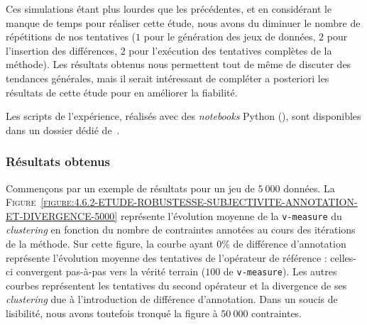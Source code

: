 			\begin{leftBarWarning}
				Ces simulations étant plus lourdes que les précédentes, et en considérant le manque de temps pour réaliser cette étude, nous avons du diminuer le nombre de répétitions de nos tentatives ($1$ pour le génération des jeux de données, $2$ pour l'insertion des différences, $2$ pour l'exécution des tentatives complètes de la méthode).
				Les résultats obtenus nous permettent tout de même de discuter des tendances générales, mais il serait intéressant de compléter a posteriori les résultats de cette étude pour en améliorer la fiabilité.
			\end{leftBarWarning}
			
			\begin{leftBarInformation}
				Les scripts de l'expérience, réalisés avec des \textit{notebooks} Python (\cite{van-rossum-drake:2009:python-reference-manual}), sont disponibles dans un dossier dédié de~\cite{schild:2021:cognitivefactory-interactiveclusteringcomparativestudy}.
			\end{leftBarInformation}
		
		
		\subsubsection{Résultats obtenus}
			
			Commençons par un exemple de résultats pour un jeu de $5~000$ données.
			La \textsc{Figure~\ref{figure:4.6.2-ETUDE-ROBUSTESSE-SUBJECTIVITE-ANNOTATION-ET-DIVERGENCE-5000}} représente l'évolution moyenne de la \texttt{v-measure} du \textit{clustering} en fonction du nombre de contraintes annotées au cours des itérations de la méthode.
			Sur cette figure, la courbe ayant $0$\% de différence d'annotation représente l'évolution moyenne des tentatives de l'opérateur de référence : celles-ci convergent pas-à-pas vers la vérité terrain ($100$ de \texttt{v-measure}).
			Les autres courbes représentent les tentatives du second opérateur et la divergence de ses \textit{clustering} due à l'introduction de différence d'annotation.
			Dans un soucis de lisibilité, nous avons toutefois tronqué la figure à $50~000$ contraintes.

